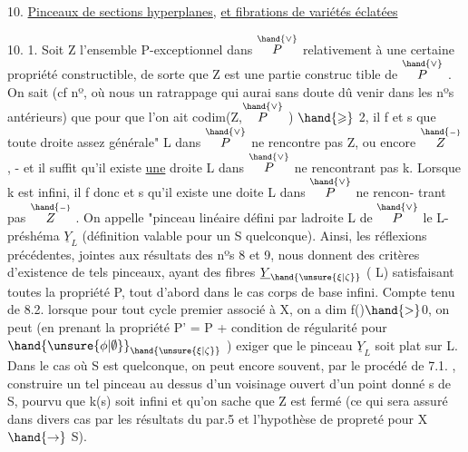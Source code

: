 
10. \uline{Pinceaux de sections hyperplanes}, \uline{et fibrations de variétés éclatées}

10. 1. Soit Z l'ensemble P-exceptionnel dans $\overset{\hand{\vee}}{P}$ relativement à une
certaine propriété constructible, de sorte que Z est une partie construc%
tible de $\overset{\hand{\vee}}{P}$ .  On sait (cf nº, où nous  un ratrappage
\margin{$/$} qui aurai sans doute dû venir dans les nºs antérieurs) que pour que
l'on ait codim(Z,$\overset{\hand{\vee}}{P}$ ) $\hand{\geqslant}$ 2, il f et s que toute droite assez
générale" L dans $\overset{\hand{\vee}}{P}$ ne rencontre pas Z,  ou encore $\overset{\hand{\scriptscriptstyle -}}{Z}$ , - et il suffit
qu'il existe \uline{une} droite L dans $\overset{\hand{\vee}}{P}$ ne rencontrant pas k. Lorsque 
k est infini, il f donc et s qu'il existe une doite L \margin{\unsure{$-$|$\wedge$}}dans $\overset{\hand{\vee}}{P}$ ne rencon-%
trant pas $\overset{\hand{\scriptscriptstyle -}}{Z}$ . On appelle "pinceau linéaire défini par ladroite
L de $\overset{\hand{\vee}}{P}$\hand{,} le L-préshéma $\underline{Y}_L$ (définition valable pour un S quelconque).
Ainsi, les réflexions précédentes, jointes aux résultats des nºs 8 et 9,
nous donnent des critères d'existence de tels pinceaux, ayant des fibres
$\underline{Y}_{\hand{\unsure{\xi|\zeta}}}$ ( \hand{$\unsure{\xi|\zeta} \in$}L) satisfaisant toutes la propriété P, tout d'abord dans le
cas   corps de base infini.  Compte tenu de
8.2.\hand{,} lorsque  pour tout cycle premier associé à X, on a dim f()$\hand{>}$0,
on peut (en prenant la propriété P' = P + condition de régularité
pour $\hand{\unsure{\phi|\emptyset}}_{\hand{\unsure{\xi|\zeta}}}$ ) exiger que le pinceau $\underline{Y}_L$ soit plat sur L. Dans le cas
où S est quelconque, on peut encore souvent, par le procédé de 7.1. ,
construire un tel pinceau au dessus d'un voisinage ouvert d'un point
donné s de S, pourvu que k(s) soit infini et qu'on sache que Z est fermé
(ce qui sera assuré dans divers cas par les résultats du par.5 et
l'hypothèse de propreté pour X $\hand{\rightarrow}$ S).

